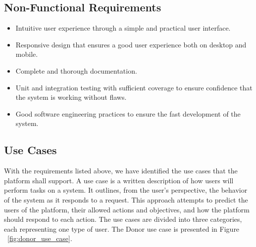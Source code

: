 \subsection{Non-Functional Requirements}
\begin{itemize}
	\item Intuitive user experience through a simple and practical user interface.
	
	\item Responsive design that ensures a good user experience both on desktop and mobile.
	
	\item Complete and thorough documentation.
	
	\item Unit and integration testing with sufficient coverage to ensure confidence that the system is working without flaws.
	
	\item Good software engineering practices to ensure the fast development of the system.
\end{itemize}

\subsection{Use Cases}\label{sec:use_cases}
With the requirements listed above, we have identified the use cases that the platform
shall support. A use case is a written description of how users will perform tasks on
a system. It outlines, from the user's perspective, the behavior of the system as it
responds to a request. This approach attempts to predict the users of the platform, their allowed actions and objectives, and how the platform should respond to each action.
The use cases are divided into three categories, each representing one type of user.
The Donor use case is presented in Figure ~\ref{fig:donor_use_case}.

